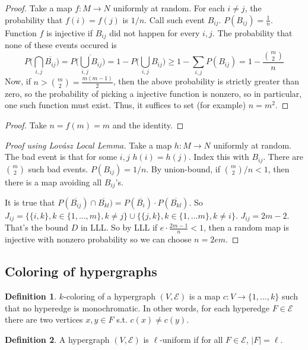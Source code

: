 \documentclass{article}
\theoremstyle{plain}
\theoremstyle{definition}
\newtheorem{defn}{Definition}
\begin{document}
\begin{proof}
	Take a map $f:M\rightarrow {N}$ uniformly at random. For each $i\neq j$, the probability that $f(i)=f(j)$ is $1/n$. Call such event $B_{ij}$. $P(B_{ij})=\frac{1}{n}$. Function $f$ is injective if $B_{ij}$ did not happen for every $i,j$. The probability that none of these events occured is $$P\bigg(\bigcap_{i,j}\overline{B_{ij}}\bigg)=P\bigg(\overline{\bigcup_{i,j}B_{ij}}\bigg)=1-P\bigg(\bigcup_{i,j}B_{ij}\bigg)\geq 1-\sum_{i,j}P(B_{ij})=1-\frac{{m\choose 2}}{n}$$ Now, if $n > {m\choose 2}=\frac{m(m-1)}{2}$, then the above probability is strictly greater than zero, so the probability of picking a injective function is nonzero, so in particular, one such function must exist. Thus, it suffices to set (for example) $n = m^2$.
\end{proof}

\begin{proof}
	Take $n=f(m)=m$ and the identity.
\end{proof}
\begin{proof}[Proof using Lovász Local Lemma]
	Take a map $h:M\rightarrow N$ uniformly at random. The bad event is that for some $i,j$ $h(i)=h(j)$. Index this with $B_{ij}$. There are ${m\choose 2}$ such bad events. $P(B_{ij})=1/n$. By union-bound, if ${m\choose 2} / n < 1$, then there is a map avoiding all $B_{ij}$'s.
	
	It is true that $P(\overline{B_{ij}})\cap \overline{B_{kl}})=P(\overline{B_i})\cdot P(\overline{B_{kl}})$. So $J_{ij}=\{\{i,k\},k\in\{1,\ldots,m\},k\neq j\}\cup\{\{j,k\},k\in\{1,\ldots m\},k\neq i\}$. $J_{ij}=2m-2$. That's the bound $D$ in LLL. So by LLL if $e\cdot\frac{2m-1}{n}<1$, then a random map is injective with nonzero probability so we can choose $n=2em$.
\end{proof}

\subsection{Coloring of hypergraphs}

\begin{defn}
	$k$-coloring of a hypergraph $(V,\mathcal{E})$ is a map $c:V\rightarrow \{1,\ldots, k\}$ such that no hyperedge is monochromatic. In other words, for each hyperedge $F \in \mathcal{E}$ there are two vertices $x,y\in F$ s.t. $c(x)\neq c(y)$.
\end{defn}

\begin{defn}
	A hypergraph $(V,\mathcal{E})$ is $\ell$-uniform if for all $F\in \mathcal{E}$, $|F|=\ell$.
\end{defn}
\end{document}
